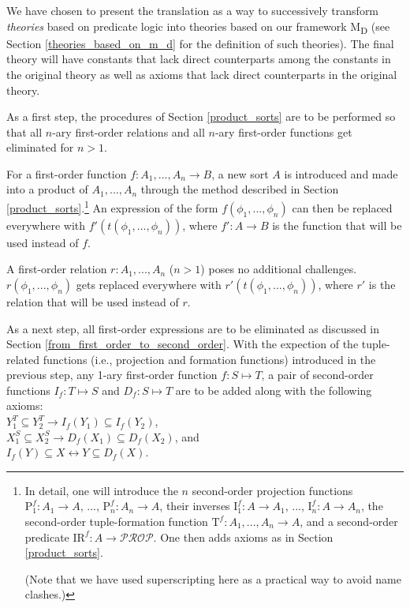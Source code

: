 \documentclass[12pt]{book}
\begin{document}
We have chosen to present the translation as a way to successively transform \textit{theories} based on predicate logic into theories based on our framework M\textsubscript{D} (see Section \ref{theories_based_on_m_d} for the definition of such theories). The final theory will have constants that lack direct counterparts among the constants in the original theory as well as axioms that lack direct counterparts in the original theory.

As a first step, the procedures of Section \ref{product_sorts} are to be performed so that all $n$-ary first-order relations and all $n$-ary first-order functions get eliminated for $n > 1$.

For a first-order function $f : A_1, ..., A_n \rightarrow B$, a new sort $A$ is introduced and made into a product of $A_1, ..., A_n$ through the method described in Section \ref{product_sorts}.\footnote{In detail, one will introduce the $n$ second-order projection functions $\mathrm{P}_1^f : A_1 \rightarrow A$, ..., $\mathrm{P}_n^f : A_n \rightarrow A$, their inverses $\mathrm{I}_1^f : A \rightarrow A_1$, ..., $\mathrm{I}_n^f : A \rightarrow A_n$, the second-order tuple-formation function $\mathrm{T}^f : A_1, ..., A_n \rightarrow A$, and a second-order predicate $\mathrm{IR}^f : A \rightarrow \mathcal{PROP}$. One then adds axioms as in Section \ref{product_sorts}.

(Note that we have used superscripting here as a practical way to avoid name clashes.)} An expression of the form $f(\phi_1, ..., \phi_n)$ can then be replaced everywhere with $f'(t(\phi_1, ..., \phi_n))$, where $f' : A \rightarrow B$ is the function that will be used instead of $f$.

A first-order relation $r : A_1, ..., A_n$ ($n > 1$) poses no additional challenges. $r(\phi_1, ..., \phi_n)$ gets replaced everywhere with $r'(t(\phi_1, ..., \phi_n))$, where $r'$ is the relation that will be used instead of $r$.

As a next step, all first-order expressions are to be eliminated as discussed in Section \ref{from_first_order_to_second_order}. With the expection of the tuple-related functions (i.e., projection and formation functions) introduced in the previous step, any 1-ary first-order function $f: S \mapsto T$, a pair of second-order functions $I_f: T \mapsto S$ and $D_f: S \mapsto T$ are to be added along with the following axioms:\\
\indent $Y_1^T \subseteq Y_2^T \rightarrow I_f(Y_1) \subseteq I_f(Y_2)$,\\
\indent $X_1^S \subseteq X_2^S \rightarrow D_f(X_1) \subseteq D_f(X_2)$, and\\
\indent $I_f(Y) \subseteq X \leftrightarrow Y \subseteq D_f(X)$.
\end{document}
